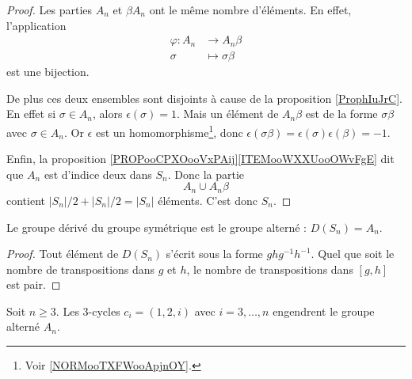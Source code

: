 \begin{proof}
	Les parties \( A_n\) et \( \beta A_n\) ont le même nombre d'éléments. En effet, l'application
	\begin{equation}
		\begin{aligned}
			\varphi\colon A_n & \to A_n\beta        \\
			\sigma            & \mapsto \sigma\beta
		\end{aligned}
	\end{equation}
	est une bijection.

	De plus ces deux ensembles sont disjoints à cause de la proposition \ref{ProphIuJrC}. En effet si \( \sigma\in A_n\), alors \( \epsilon(\sigma)=1\). Mais un élément de \( A_n\beta\) est de la forme \( \sigma\beta\) avec \( \sigma\in A_n\). Or \( \epsilon\) est un homomorphisme\footnote{Voir \ref{NORMooTXFWooApjnOY}.}, donc \( \epsilon(\sigma\beta)=\epsilon(\sigma)\epsilon(\beta)=-1\).

	Enfin, la proposition \ref{PROPooCPXOooVxPAij}\ref{ITEMooWXXUooOWvFgE} dit que \( A_n\) est d'indice deux dans \( S_n\). Donc la partie
	\begin{equation}
		A_n\cup A_n\beta
	\end{equation}
	contient \( | S_n |/2+| S_n |/2=| S_n |\) éléments. C'est donc \( S_n\).
\end{proof}

\begin{lemma}   \label{LemiApyfp}   
	Le groupe dérivé du groupe symétrique est le groupe alterné : \( D(S_n)=A_n\).
\end{lemma}

\begin{proof}
	Tout élément de \( D(S_n)\) s'écrit sous la forme \( ghg^{-1}h^{-1}\). Quel que soit le nombre de transpositions dans \( g\) et \( h\), le nombre de transpositions dans \( [g,h]\) est pair.
\end{proof}

\begin{proposition}     \label{PropsHlmvv}
	Soit \( n\geq 3\). Les \( 3\)-cycles \( c_i=(1,2,i)\) avec \( i=3,\ldots, n\) engendrent le groupe alterné \( A_n\).
\end{proposition}

